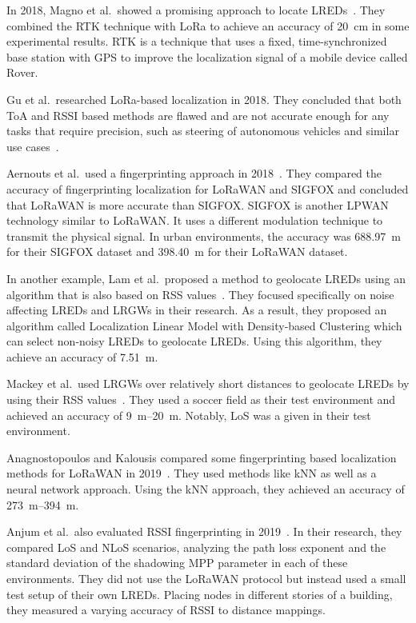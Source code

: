 In 2018, Magno et al.\ showed a promising approach to locate \aclp{LRED}~\cite{magno_poster_2018}.
They combined the \acf{RTK} technique with \ac{LoRa} to achieve an accuracy of \SI{20}{\centi\meter} in some experimental results.
\ac{RTK} is a technique that uses a fixed, time-synchronized base station with \ac{GPS} to improve the localization signal of a mobile device called Rover.

Gu et al.\ researched \ac{LoRa}-based localization in 2018.
They concluded that both \ac{ToA} and \ac{RSSI} based methods are flawed and are not accurate enough for any tasks that require precision, such as steering of autonomous vehicles and similar use cases~\cite{gu_lora-based_2018}.

Aernouts et al.\ used a fingerprinting approach in 2018~\cite{aernouts_sigfox_2018}.
They compared the accuracy of fingerprinting localization for \ac{LoRaWAN} and SIGFOX and concluded that \ac{LoRaWAN} is more accurate than SIGFOX.
SIGFOX is another \ac{LPWAN} technology similar to \ac{LoRaWAN}.
It uses a different modulation technique to transmit the physical signal.
In urban environments, the accuracy was \SI{688.97}{\meter} for their SIGFOX dataset and \SI{398.40}{\meter} for their LoRaWAN dataset.

In another example, Lam et al.~proposed a method to geolocate \aclp{LRED} using an algorithm that is also based on \ac{RSS} values~\cite{lam_new_2018}.
They focused specifically on noise affecting \aclp{LRED} and \aclp{LRGW} in their research.
As a result, they proposed an algorithm called Localization Linear Model with Density-based Clustering which can select non-noisy \aclp{LRED} to geolocate \aclp{LRED}.
Using this algorithm, they achieve an accuracy of \SI{7.51}{\meter}.

Mackey et al.~used \aclp{LRGW} over relatively short distances to geolocate \aclp{LRED} by using their \ac{RSS} values~\cite{mackey_lora-based_2019}.
They used a soccer field as their test environment and achieved an accuracy of \SIrange{9}{20}{\meter}.
Notably, \ac{LoS} was a given in their test environment.

Anagnostopoulos and Kalousis compared some fingerprinting based localization methods for \ac{LoRaWAN} in 2019~\cite{anagnostopoulos_reproducible_2019}.
They used methods like \ac{kNN} as well as a neural network approach.
Using the \ac{kNN} approach, they achieved an accuracy of \SIrange{273}{394}{\meter}.

Anjum et al.\ also evaluated \ac{RSSI} fingerprinting in 2019~\cite{anjum_analysis_2019}.
In their research, they compared \ac{LoS} and \ac{NLoS} scenarios, analyzing the path loss exponent and the standard deviation of the shadowing \ac{MPP} parameter in each of these environments.
They did not use the \ac{LoRaWAN} protocol but instead used a small test setup of their own \aclp{LRED}.
Placing nodes in different stories of a building, they measured a varying accuracy of \ac{RSSI} to distance mappings.


